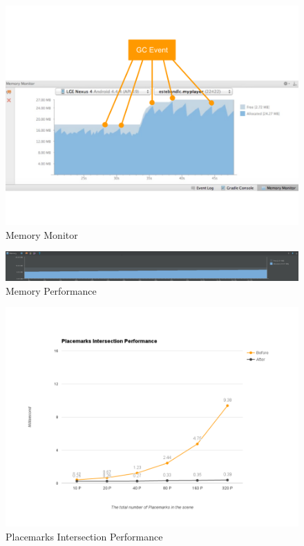 \begin{figure}[H]
	\caption{Memory Monitor}
	\label{fig:memory-monitor}
	\centering
	\includegraphics[width=\textwidth, keepaspectratio]{Figures/memory-monitor.png}
	\decoRule
\end{figure}



\begin{figure}[H]
	\caption{Memory Performance}
	\label{fig:memory-performance}
	\centering
	\includegraphics[width=\textwidth, keepaspectratio]{Figures/memory-performance.png}
	\decoRule
\end{figure}



\begin{figure}[H]
	\caption{Placemarks Intersection Performance}
	\label{fig:placemarks-intersection-performance}
	\centering
	\includegraphics[width=\textwidth, keepaspectratio]{Figures/placemarks-intersection-performance.png}
	\decoRule
\end{figure}



